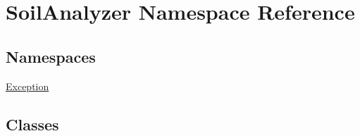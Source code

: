 \hypertarget{namespace_soil_analyzer}{}\section{Soil\+Analyzer Namespace Reference}
\label{namespace_soil_analyzer}
\subsection*{Namespaces}
\begin{DoxyCompactItemize}
\item 
 \hyperlink{namespace_soil_analyzer_1_1_exception}{Exception}
\end{DoxyCompactItemize}
\subsection*{Classes}
